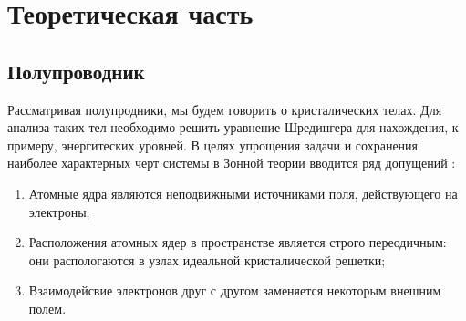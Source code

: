 \chapter{Теоретическая часть}
\section{Полупроводник}
Рассматривая полупродники, мы будем говорить о кристалических телах. Для анализа таких тел необходимо решить уравнение Шредингера для нахождения, к примеру, энергитеских уровней. В целях упрощения задачи и сохранения наиболее характерных черт системы в Зонной теории вводится ряд допущений \cite{Kalashnikov}: 
\begin{enumerate}
	\item Атомные ядра являются неподвижными источниками поля, действующего на электроны;
	\item Расположения атомных ядер в пространстве является строго переодичным: они распологаются в узлах идеальной кристалической решетки;
	\item Взаимодейсвие электронов друг с другом заменяется некоторым внешним полем.
\end{enumerate}

